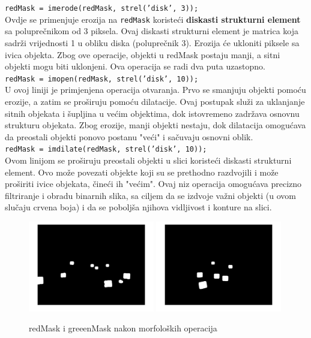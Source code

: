 \documentclass[a4paper,12pt]{article}
\begin{document}
\texttt{redMask = imerode(redMask, strel('disk', 3));}
\\

Ovdje se primenjuje erozija na \texttt{redMask} koristeći \textbf{diskasti strukturni element} sa poluprečnikom od 3 piksela. 
Ovaj diskasti strukturni element je matrica koja sadrži vrijednosti 1 u obliku diska (poluprečnik 3). 
Erozija će ukloniti piksele sa ivica objekta. 
Zbog ove operacije, objekti u redMask postaju manji, a sitni objekti mogu biti uklonjeni. Ova operacija se radi dva puta uzastopno.\\


\texttt{redMask = imopen(redMask, strel('disk', 10));}\\

U ovoj liniji je primjenjena operacija otvaranja. Prvo se smanjuju objekti pomoću erozije, a zatim se proširuju pomoću dilatacije.  
Ovaj postupak služi za uklanjanje sitnih objekata i šupljina u većim objektima, dok istovremeno zadržava osnovnu strukturu objekata. 
Zbog erozije, manji objekti nestaju, dok dilatacija omogućava da preostali objekti ponovo postanu "veći" i sačuvaju osnovni oblik.\\


\texttt{redMask = imdilate(redMask, strel('disk', 10));}\\

Ovom linijom se proširuju preostali objekti u slici koristeći diskasti strukturni element. Ovo može povezati objekte koji su se prethodno razdvojili i može proširiti ivice objekata, čineći ih "većim".
Ovaj niz operacija omogućava precizno filtriranje i obradu binarnih slika, sa ciljem da se izdvoje važni objekti (u ovom slučaju crvena boja) i da se poboljša njihova vidljivost i konture na slici.


\begin{figure}[htbp]
    \centering
    \includegraphics[width=0.49\textwidth]{morphred.jpg}
    \hfill
    \includegraphics[width=0.49\textwidth]{morphgreen.jpg} 
    \caption{redMask i greeenMask nakon morfoloških operacija}
    \label{fig:redMaskgreenMask}
\end{figure}
\end{document}
